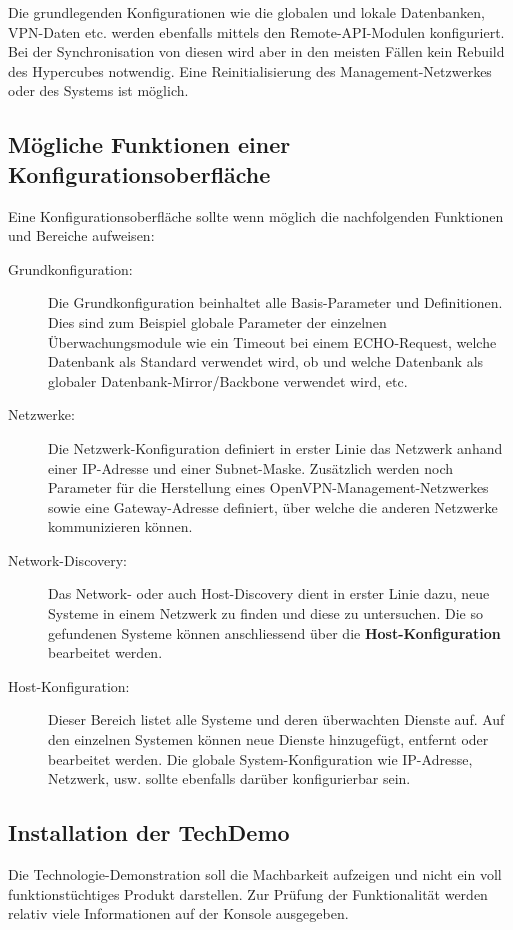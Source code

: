 Die grundlegenden Konfigurationen wie die globalen und lokale Datenbanken, VPN-Daten etc. werden ebenfalls mittels den Remote-API-Modulen konfiguriert. Bei der Synchronisation von diesen wird aber in den meisten F\"allen kein Rebuild des Hypercubes notwendig. Eine Reinitialisierung des Management-Netzwerkes oder des Systems ist m\"oglich.

\subsection{M\"ogliche Funktionen einer Konfigurationsoberfl\"ache} \label{sec:praxis-install-conf}
Eine Konfigurationsoberfl\"ache sollte wenn m\"oglich die nachfolgenden Funktionen und Bereiche aufweisen:

\begin{description}
 \item[Grundkonfiguration:] Die Grundkonfiguration beinhaltet alle Basis-Parameter und Definitionen. Dies sind zum Beispiel globale Parameter der einzelnen \"Uberwachungsmodule wie ein Timeout bei einem ECHO-Request, welche Datenbank als Standard verwendet wird, ob und welche Datenbank als globaler Datenbank-Mirror/Backbone verwendet wird, etc.

 \item[Netzwerke:] Die Netzwerk-Konfiguration definiert in erster Linie das Netzwerk anhand einer IP-Adresse und einer Subnet-Maske. Zus\"atzlich werden noch Parameter f\"ur die Herstellung eines OpenVPN-Management-Netzwerkes sowie eine Gateway-Adresse definiert, \"uber welche die anderen Netzwerke kommunizieren k\"onnen.

 \item[Network-Discovery:] Das Network- oder auch Host-Discovery dient in erster Linie dazu, neue Systeme in einem Netzwerk zu finden und diese zu untersuchen. Die so gefundenen Systeme k\"onnen anschliessend \"uber die \textbf{Host-Konfiguration} bearbeitet werden.

 \item[Host-Konfiguration:] Dieser Bereich listet alle Systeme und deren \"uberwachten Dienste auf. Auf den einzelnen Systemen k\"onnen neue Dienste hinzugef\"ugt, entfernt oder bearbeitet werden. Die globale System-Konfiguration wie IP-Adresse, Netzwerk, usw. sollte ebenfalls dar\"uber konfigurierbar sein.
\end{description}

\subsection{Installation der TechDemo} \label{sec:praxis-install-demo}
Die Technologie-Demonstration soll die Machbarkeit aufzeigen und nicht ein voll funktionst\"uchtiges Produkt darstellen. Zur Pr\"ufung der Funktionalit\"at werden relativ viele Informationen auf der Konsole ausgegeben.

